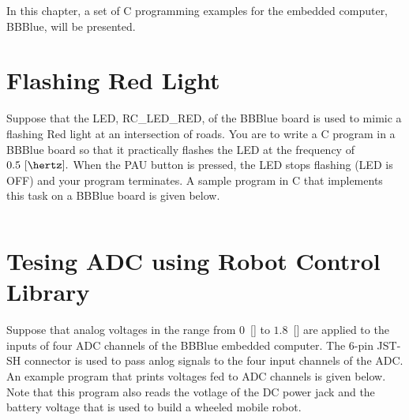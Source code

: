 
In this chapter, a set of C programming examples for the  embedded computer, BBBlue,  will be presented.  

\section{Flashing Red Light}
\label{sec:appFlashingRedLight}
  Suppose that the LED, RC\_LED\_RED, of the BBBlue board is used  to mimic a flashing Red light at an intersection of roads. You are to write a C program in a BBBlue board so that it practically flashes the LED at the frequency of $0.5~[\hertz].$ When the PAU button is pressed, the LED stops flashing (LED is OFF) and your program terminates. A sample program in C that implements this task on a BBBlue board is given below. 

  \begin{mdframed}[backgroundcolor=yellow!5,roundcorner=7pt,outerlinecolor=blue!70!black,outerlinewidth=1.2,frametitle=A sample program that implements the task of flashing red light.]

    \inputminted[breaklines,linenos]{C}{latex/programmingC/embeddedComputerProgramming/flashingRedLight.c}

  \end{mdframed}

\section{Tesing ADC using Robot Control Library}
\label{sec:appRC-TestADC}

Suppose that analog voltages in the range from $0$~[\volt] to $1.8$~[\volt] are applied to the inputs of four ADC channels of the BBBlue embedded computer. The 6-pin JST-SH connector is used to pass anlog signals to the four input channels of the ADC. An example program that prints voltages fed to ADC channels is given below. Note that this program also reads the votlage of the DC power jack and the battery voltage that is used to build a wheeled mobile robot. 


  \begin{mdframed}[backgroundcolor=yellow!5,roundcorner=7pt,outerlinecolor=blue!70!black,outerlinewidth=1.2,frametitle=A sample program that prints voltages read by all ADC channels.]

    \inputminted[breaklines,linenos]{C}{../librobotcontrol-master/examples/src/rc_test_adc.c}

  \end{mdframed}


